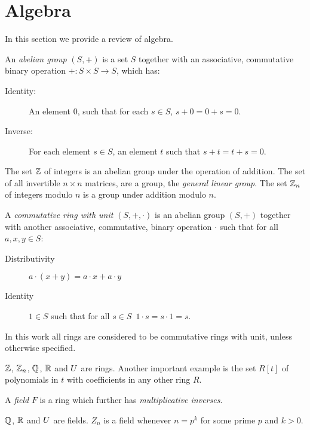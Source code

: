 \section{Algebra}
In this section we provide a review of algebra. 
\begin{definition}
An \emph{abelian group} $(S,+)$ is a set $S$ together with an associative, commutative binary operation $+: S \times S \rightarrow S$, which has:
\begin{description}
\item[Identity:] An element $0$, such that for each $s \in S$, $s+0 = 0+s = 0$.
\item[Inverse:] For each element $s \in S$, an element $t$ such that $s+t = t+s = 0$.
\end{description}
\end{definition}
\begin{example}
The set $\mathbb{Z}$ of integers is an abelian group under the operation of addition. The set of all invertible $n \times n$ matrices, are a group, the \emph{general linear group}.
The set $\mathbb{Z}_n$ of integers modulo $n$ is a group under addition modulo $n$.
\end{example}
\begin{definition}[Ring]
A \emph{commutative ring with unit} $(S,+,\cdot)$ is an abelian group $(S,+)$  together with another associative, commutative, binary operation $\cdot$ such that for all $a,x,y \in S$:
\begin{description}
\item[Distributivity] $a \cdot (x + y)  = a \cdot x + a \cdot y$ 
\item[Identity] $1 \in S$ such that for all $s \in S$\, $1 \cdot s = s \cdot 1 = s$. 
\end{description}
\end{definition}
In this work all rings are considered to be commutative rings with unit, unless otherwise specified.  
\begin{example}
$\mathbb{Z}$, $\mathbb{Z}_n$, $\mathbb{Q}$, $\mathbb{R}$ and $U$ are rings. Another important example is the set $R[t]$ of polynomials in $t$ with coefficients in any other ring $R$.
\end{example}
\begin{definition}[Field]
A \emph{field} $F$ is a ring which further has \emph{multiplicative inverses}.
\end{definition}
\begin{example}
$\mathbb{Q}$, $\mathbb{R}$ and $U$ are fields.  $Z_n$ is a field whenever $n = p^k$ for some prime $p$ and $k > 0$.
\end{example}
